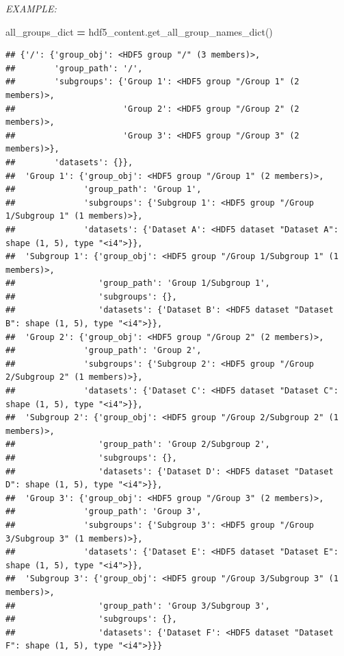 \documentclass[
]{article}
\newenvironment{Shaded}{\begin{snugshade}}{\end{snugshade}}
\newcommand{\NormalTok}[1]{#1}
\newcommand{\OperatorTok}[1]{\textcolor[rgb]{0.81,0.36,0.00}{\textbf{#1}}}
\begin{document}
\emph{EXAMPLE:}

\begin{Shaded}
\begin{Highlighting}[]
\NormalTok{all_groups_dict }\OperatorTok{=}\NormalTok{ hdf5_content.get_all_group_names_dict()}
\end{Highlighting}
\end{Shaded}

\begin{verbatim}
## {'/': {'group_obj': <HDF5 group "/" (3 members)>,
##        'group_path': '/',
##        'subgroups': {'Group 1': <HDF5 group "/Group 1" (2 members)>,
##                      'Group 2': <HDF5 group "/Group 2" (2 members)>,
##                      'Group 3': <HDF5 group "/Group 3" (2 members)>},
##        'datasets': {}},
##  'Group 1': {'group_obj': <HDF5 group "/Group 1" (2 members)>,
##              'group_path': 'Group 1',
##              'subgroups': {'Subgroup 1': <HDF5 group "/Group 1/Subgroup 1" (1 members)>},
##              'datasets': {'Dataset A': <HDF5 dataset "Dataset A": shape (1, 5), type "<i4">}},
##  'Subgroup 1': {'group_obj': <HDF5 group "/Group 1/Subgroup 1" (1 members)>,
##                 'group_path': 'Group 1/Subgroup 1',
##                 'subgroups': {},
##                 'datasets': {'Dataset B': <HDF5 dataset "Dataset B": shape (1, 5), type "<i4">}},
##  'Group 2': {'group_obj': <HDF5 group "/Group 2" (2 members)>,
##              'group_path': 'Group 2',
##              'subgroups': {'Subgroup 2': <HDF5 group "/Group 2/Subgroup 2" (1 members)>},
##              'datasets': {'Dataset C': <HDF5 dataset "Dataset C": shape (1, 5), type "<i4">}},
##  'Subgroup 2': {'group_obj': <HDF5 group "/Group 2/Subgroup 2" (1 members)>,
##                 'group_path': 'Group 2/Subgroup 2',
##                 'subgroups': {},
##                 'datasets': {'Dataset D': <HDF5 dataset "Dataset D": shape (1, 5), type "<i4">}},
##  'Group 3': {'group_obj': <HDF5 group "/Group 3" (2 members)>,
##              'group_path': 'Group 3',
##              'subgroups': {'Subgroup 3': <HDF5 group "/Group 3/Subgroup 3" (1 members)>},
##              'datasets': {'Dataset E': <HDF5 dataset "Dataset E": shape (1, 5), type "<i4">}},
##  'Subgroup 3': {'group_obj': <HDF5 group "/Group 3/Subgroup 3" (1 members)>,
##                 'group_path': 'Group 3/Subgroup 3',
##                 'subgroups': {},
##                 'datasets': {'Dataset F': <HDF5 dataset "Dataset F": shape (1, 5), type "<i4">}}}
\end{verbatim}
\end{document}
